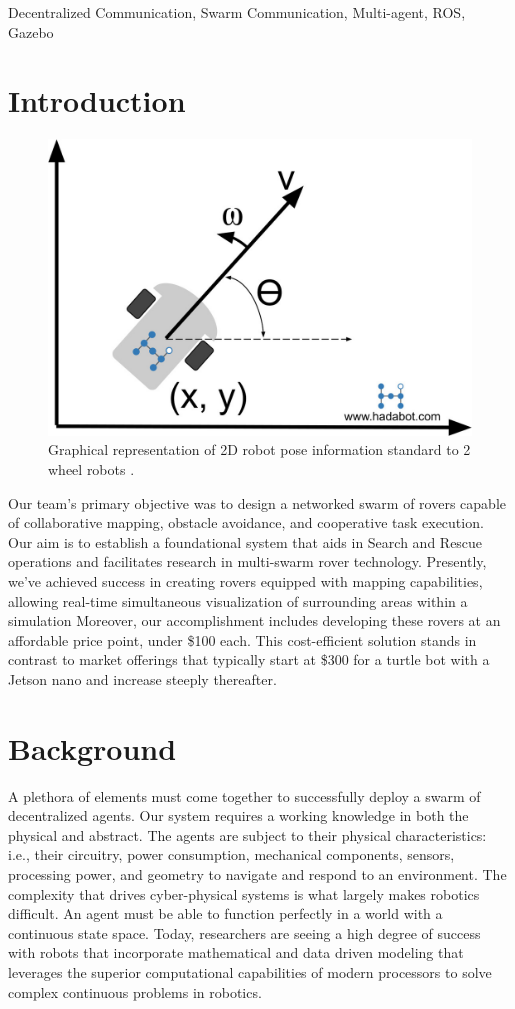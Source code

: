 \documentclass[conference]{IEEEtran}
\begin{document}
\begin{IEEEkeywords}
Decentralized Communication, Swarm Communication, Multi-agent, ROS, Gazebo
\end{IEEEkeywords}

\section{Introduction}
\begin{figure}
	\includegraphics[width=\linewidth]{hadabot_unicycle_diagram_01.jpg}
	\caption{Graphical representation of 2D robot pose information standard to 2 wheel robots \cite{RN109}.}
\end{figure}
Our team's primary objective was to design a networked swarm of rovers capable of collaborative mapping, obstacle avoidance, and cooperative task execution. Our aim is to establish a foundational system that aids in Search and Rescue operations and facilitates research in multi-swarm rover technology. Presently, we've achieved success in creating rovers equipped with mapping capabilities, allowing real-time simultaneous visualization of surrounding areas within a simulation Moreover, our accomplishment includes developing these rovers at an affordable price point, under \$100 each. This cost-efficient solution stands in contrast to market offerings that typically start at \$300 for a turtle bot with a Jetson nano and increase steeply thereafter.

\section{Background} 
A plethora of elements must come together to successfully deploy a swarm of decentralized agents. Our system requires a working knowledge in both the physical and abstract. The agents are subject to their physical characteristics: i.e., their circuitry, power consumption, mechanical components, sensors, processing power, and geometry to navigate and respond to an environment. The complexity that drives cyber-physical systems is what largely makes robotics difficult. An agent must be able to function perfectly in a world with a continuous state space. Today, researchers are seeing a high degree of success with robots that incorporate mathematical and data driven modeling that leverages the superior computational capabilities of modern processors to solve complex continuous problems in robotics. 
\end{document}
